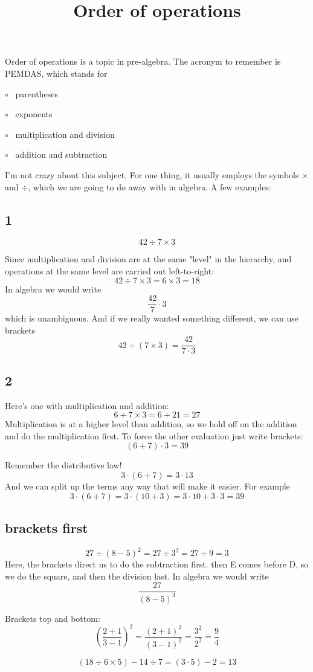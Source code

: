 \documentclass[11pt, oneside]{article}
\title{Order of operations}
\date{}
\begin{document}
\maketitle
\Large


Order of operations is a topic in pre-algebra.  The acronym to remember is PEMDAS, which stands for

$\circ$ \ parentheses

$\circ$ \ exponents

$\circ$ \ multiplication and division

$\circ$ \ addition and subtraction

I'm not crazy about this subject.  For one thing, it usually employs the symbols $\times$ and $\div$, which we are going to do away with in algebra.  A few examples:

\subsection*{1}

\[ 42 \div 7 \times 3 \]

Since multiplication and division are at the same "level" in the hierarchy, and operations at the same level are carried out left-to-right: 
\[ 42 \div 7 \times 3 = 6 \times 3 = 18 \]
In algebra we would write
\[ \frac{42}{7} \cdot 3 \]
which is unambiguous.  And if we really wanted something different, we can use brackets
\[ 42 \div (7 \times 3) = \frac{42}{7 \cdot 3} \]

\subsection*{2}

Here's one with multiplication and addition:
\[ 6 + 7 \times 3 = 6 + 21 = 27 \]
Multiplication is at a higher level than addition, so we hold off on the addition and do the multiplication first.  To force the other evaluation just write brackets:
\[ (6 + 7) \cdot 3  = 39 \]

Remember the distributive law!
\[ 3 \cdot (6 + 7) = 3 \cdot 13 \]
And we can split up the terms any way that will make it easier.  For example
\[ 3 \cdot (6 + 7) = 3 \cdot (10 + 3) = 3 \cdot 10 + 3 \cdot 3 = 39 \]

\subsection*{brackets first}

\[ 27 \div (8 - 5)^2 = 27 \div 3^2 = 27 \div 9 = 3 \]
Here, the brackets direct us to do the subtraction first.  then E comes before D, so we do the square, and then the division last.  In algebra we would write
\[ \frac{27}{(8-5)^3} \]

Brackets top and bottom:
\[ (\frac{2 + 1}{3 - 1})^2 = \frac{(2 + 1)^2}{(3 - 1)^2} = \frac{3^2}{2^2} = \frac{9}{4} \]

\[ (18 \div 6 \times 5) - 14 \div 7 = (3 \cdot 5) - 2 = 13 \]
\end{document}
